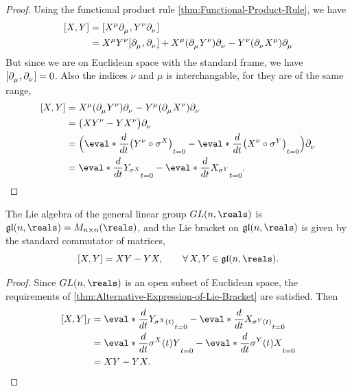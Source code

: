 \documentclass[../main.tex]{subfiles}
\begin{document}
\begin{proof}
    Using the functional product rule \cref{thm:Functional-Product-Rule},
    we have
    \[
        \begin{aligned}
        [X, Y] &= [X^\mu\tfld{\mu}, Y^\nu\tfld{\nu}] \\
               &= X^\mu Y^\nu[\tfld{\mu}, \tfld{\nu}] +
                  X^\mu(\tfld{\mu}Y^\nu)\tfld{\nu} - 
                  Y^\nu(\tfld{\nu}X^\mu)\tfld{\mu} \\
        \end{aligned}
    \]
    But since we are on Euclidean space with the standard frame, we have
    \([\tfld{\mu}, \tfld{\nu}] = 0\). Also the indices \(\nu\) and
    \(\mu\) is interchangable, for they are of the same range,
    \[
    \begin{aligned}
        [X, Y] &= X^\mu(\tfld{\mu}Y^\nu)\tfld{\nu} - 
                  Y^\mu(\tfld{\mu}X^\nu)\tfld{\nu} \\
               &= \big(XY^\nu - YX^\nu\big) \tfld{\nu}\\
               &= \Big(\eval*{\frac{d}{dt}\big(Y^\nu\circ
                       \sigma^X\big)}_{t=0} -
                       \eval*{\frac{d}{dt}\big(X^\nu\circ
                   \sigma^Y\big)}_{t=0}\Big)\tfld{\nu} \\
               &= \eval*{\frac{d}{dt}Y_{\sigma^X}}_{t=0} -
               \eval*{\frac{d}{dt}X_{\sigma^Y}}_{t=0}.
    \end{aligned}
    \]
\end{proof}
\begin{theorem}
\label{thm:The-Lie-Algebra-of-General-Linear-Groups}
    The Lie algebra of the general linear group \(\GL{n}{\reals}\) is
    \(\gl{n}{\reals} = M_{n\times n}(\reals)\), and the Lie bracket on
    \(\gl{n}{\reals}\) is given by the standard commutator of matrices,
    \[
        [X, Y] = XY - YX, \qquad \forall\, X, Y \in \gl{n}{\reals}.
    \]
\end{theorem}
\begin{proof}
    Since \(\GL{n}{\reals}\) is an open subset of Euclidean space, the
    requirements of \cref{thm:Alternative-Expression-of-Lie-Bracket} are
    satisfied. Then
    \[
    \begin{aligned}
        [X, Y]_I &= \eval*{\frac{d}{dt}Y_{\sigma^X(t)}}_{t=0} -
        \eval*{\frac{d}{dt}X_{\sigma^Y(t)}}_{t=0} \\
        &= \eval*{\frac{d}{dt}\sigma^X(t)Y}_{t=0} -
        \eval*{\frac{d}{dt}\sigma^Y(t)X}_{t=0} \\
        &= XY - YX.
    \end{aligned}
    \]
\end{proof}
\end{document}
